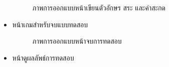 \documentclass[12pt,oneside,openright,a4paper]{cpe-thai-project}
\begin{document}
\begin{itemize}
\begin{figure}[!ht]
    \setlength{\fboxsep}{1cm}
    \caption{ภาพการออกแบบหน้าเขียนตัวอักษร สระ และคำสะกด}\label{fig:system}
  \end{figure}
  \newpage
  \item หน้าเกมสำหรับจบแบบทดสอบ
  \begin{figure}[!ht]\centering
    \setlength{\fboxrule}{0.2mm} %
    \setlength{\fboxsep}{1cm}
    \caption{ภาพการออกแบบหน้าจบการทดสอบ}\label{fig:system}
  \end{figure}
  \item หน้าดูผลลัพธ์การทดสอบ
    \begin{figure}[!ht]\centering
      \setlength{\fboxrule}{0.2mm} %
      \setlength{\fboxsep}{1cm}

\end{figure}
\end{itemize}
\end{document}
